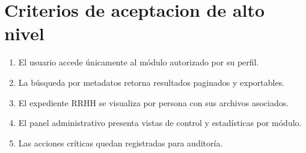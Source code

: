 \section{Criterios de aceptacion de alto nivel}
\begin{enumerate}
  \item El usuario accede únicamente al módulo autorizado por su perfil.
  \item La búsqueda por metadatos retorna resultados paginados y exportables.
  \item El expediente RRHH se visualiza por persona con sus archivos asociados.
  \item El panel administrativo presenta vistas de control y estadísticas por módulo.
  \item Las acciones críticas quedan registradas para auditoría.
\end{enumerate}
